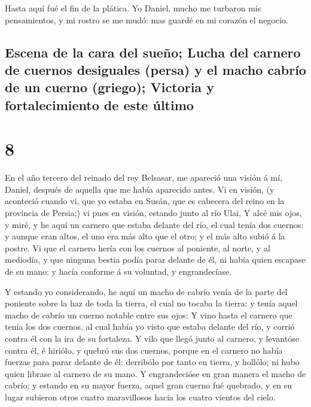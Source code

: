  Hasta aquí fué el fin de la plática. Yo Daniel, mucho me
turbaron mis pensamientos, y mi rostro se me mudó: mas guardé en mi
corazón el negocio.

\hypertarget{escena-de-la-cara-del-sueuxf1o-lucha-del-carnero-de-cuernos-desiguales-persa-y-el-macho-cabruxedo-de-un-cuerno-griego-victoria-y-fortalecimiento-de-este-uxfaltimo}{%
\subsection{Escena de la cara del sueño; Lucha del carnero de cuernos
desiguales (persa) y el macho cabrío de un cuerno (griego); Victoria y
fortalecimiento de este
último}\label{escena-de-la-cara-del-sueuxf1o-lucha-del-carnero-de-cuernos-desiguales-persa-y-el-macho-cabruxedo-de-un-cuerno-griego-victoria-y-fortalecimiento-de-este-uxfaltimo}}

\hypertarget{section-7}{%
\section{8}\label{section-7}}

 En el año tercero del reinado del rey Belsasar, me apareció
una visión á mí, Daniel, después de aquella que me había aparecido
antes.  Vi en visión, (y aconteció cuando vi, que yo estaba
en Susán, que es cabecera del reino en la provincia de Persia;) vi pues
en visión, estando junto al río Ulai,  Y alcé mis ojos, y
miré, y he aquí un carnero que estaba delante del río, el cual tenía dos
cuernos: y aunque eran altos, el uno era más alto que el otro; y el más
alto subió á la postre.  Vi que el carnero hería con los
cuernos al poniente, al norte, y al mediodía, y que ninguna bestia podía
parar delante de él, ni había quien escapase de su mano: y hacía
conforme á su voluntad, y engrandecíase.

 Y estando yo considerando, he aquí un macho de cabrío venía
de la parte del poniente sobre la haz de toda la tierra, el cual no
tocaba la tierra: y tenía aquel macho de cabrío un cuerno notable entre
sus ojos:  Y vino hasta el carnero que tenía los dos
cuernos, al cual había yo visto que estaba delante del río, y corrió
contra él con la ira de su fortaleza.  Y vilo que llegó
junto al carnero, y levantóse contra él, é hiriólo, y quebró sus dos
cuernos, porque en el carnero no había fuerzas para parar delante de él:
derribólo por tanto en tierra, y hollólo; ni hubo quien librase al
carnero de su mano.  Y engrandecióse en gran manera el macho
de cabrío; y estando en su mayor fuerza, aquel gran cuerno fué quebrado,
y en su lugar subieron otros cuatro maravillosos hacia los cuatro
vientos del cielo.

